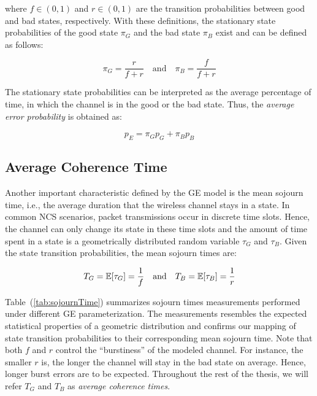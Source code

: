 where $f\in(0,1)$ and $r\in(0,1)$ are the transition probabilities between good
and bad states, respectively. With these definitions, the stationary state
probabilities of the good state $\pi_G$ and the bad state $\pi_B$ exist and can
be defined as follows:

\begin{equation}
  \pi_G = \frac{r}{f+r} \quad \textrm{and} \quad \pi_B = \frac{f}{f+r}
\end{equation}

The stationary state probabilities can be interpreted as the average percentage
of time, in which the channel is in the good or the bad state. Thus, the
\textit{average error probability} is obtained as:

\begin{equation}
  p_E = \pi_G p_G + \pi_B p_B
  \label{eq:avgLoss}
\end{equation}

\subsection*{Average Coherence Time}
Another important characteristic defined by the GE model is the mean sojourn
time, i.e., the average duration that the wireless channel stays in a state. In
common NCS scenarios, packet transmissions occur in discrete time slots. Hence,
the channel can only change its state in these time slots and the amount of time
spent in a state is a geometrically distributed random variable $\tau_G$ and
$\tau_B$. Given the state transition probabilities, the mean sojourn times are:

\begin{equation}
  T_G = \mathbb{E}[\tau_G] = \frac{1}{f} \quad \textrm{and} \quad T_B = \mathbb{E}[\tau_B] = \frac{1}{r}
\end{equation}

Table~(\ref{tab:sojournTime}) summarizes sojourn times measurements performed
under different GE parameterization. The measurements resembles the expected
statistical properties of a geometric distribution and confirms our mapping of
state transition probabilities to their corresponding mean sojourn time. Note
that both $f$ and $r$ control the ``burstiness'' of the modeled channel. For
instance, the smaller $r$ is, the longer the channel will stay in the bad state
on average. Hence, longer burst errors are to be expected. Throughout the rest
of the thesis, we will refer $T_G$ and $T_B$ as \textit{average coherence
times}.

